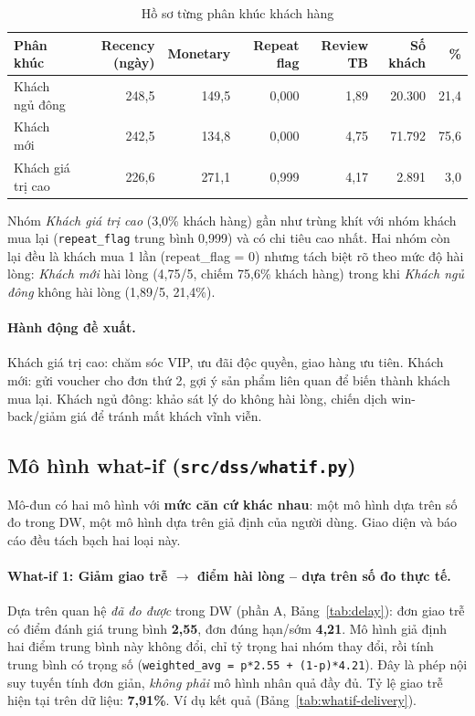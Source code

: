 \documentclass[12pt,a4paper]{article}
\newcommand{\code}[1]{\texttt{\small #1}}
\begin{document}
\begin{table}[h]
\centering
\caption{Hồ sơ từng phân khúc khách hàng}\label{tab:segments}
\small
\begin{tabular}{@{}l r r r r r r@{}}
\toprule
\textbf{Phân khúc} & \textbf{Recency (ngày)} & \textbf{Monetary} & \textbf{Repeat flag} & \textbf{Review TB} & \textbf{Số khách} & \textbf{\%}\\
\midrule
Khách ngủ đông & 248,5 & 149,5 & 0,000 & 1,89 & 20.300 & 21,4\\
Khách mới & 242,5 & 134,8 & 0,000 & 4,75 & 71.792 & 75,6\\
Khách giá trị cao & 226,6 & 271,1 & 0,999 & 4,17 & 2.891 & 3,0\\
\bottomrule
\end{tabular}
\end{table}

Nhóm \emph{Khách giá trị cao} (3,0\% khách hàng) gần như trùng khít với nhóm khách mua lại (\code{repeat\_flag}
trung bình 0,999) và có chi tiêu cao nhất. Hai nhóm còn lại đều là khách mua 1 lần (repeat\_flag = 0) nhưng
tách biệt rõ theo mức độ hài lòng: \emph{Khách mới} hài lòng (4,75/5, chiếm 75,6\% khách hàng) trong khi
\emph{Khách ngủ đông} không hài lòng (1,89/5, 21,4\%).

\paragraph{Hành động đề xuất.} Khách giá trị cao: chăm sóc VIP, ưu đãi độc quyền, giao hàng ưu tiên. Khách
mới: gửi voucher cho đơn thứ 2, gợi ý sản phẩm liên quan để biến thành khách mua lại. Khách ngủ đông: khảo sát
lý do không hài lòng, chiến dịch win-back/giảm giá để tránh mất khách vĩnh viễn.

\subsection{Mô hình what-if (\code{src/dss/whatif.py})}

Mô-đun có hai mô hình với \textbf{mức căn cứ khác nhau}: một mô hình dựa trên số đo trong DW, một mô hình
dựa trên giả định của người dùng. Giao diện và báo cáo đều tách bạch hai loại này.

\paragraph{What-if 1: Giảm giao trễ \(\to\) điểm hài lòng -- dựa trên số đo thực tế.}
Dựa trên quan hệ \emph{đã đo được} trong DW (phần A, Bảng~\ref{tab:delay}): đơn giao trễ có điểm đánh giá trung bình
\textbf{2,55}, đơn đúng hạn/sớm \textbf{4,21}. Mô hình giả định hai điểm trung bình này không đổi, chỉ tỷ
trọng hai nhóm thay đổi, rồi tính trung bình có trọng số
(\code{weighted\_avg = p*2.55 + (1-p)*4.21}). Đây là phép nội suy tuyến tính đơn giản, \emph{không phải} mô
hình nhân quả đầy đủ. Tỷ lệ giao trễ hiện tại trên dữ liệu: \textbf{7,91\%}. Ví dụ kết quả (Bảng~\ref{tab:whatif-delivery}).
\end{document}
